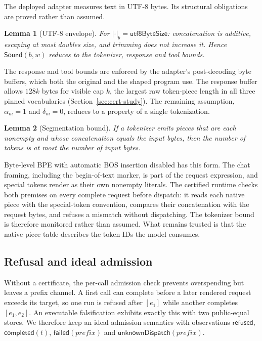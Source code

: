 \documentclass[preprint,12pt]{elsarticle}
\newtheorem{lemma}{Lemma}
\theoremstyle{definition}
\begin{document}
The deployed adapter measures text in UTF-8 bytes. Its structural obligations
are proved rather than assumed.

\begin{lemma}[UTF-8 envelope]\label{lem:utf8}
For $|\cdot|_b=\mathsf{utf8ByteSize}$: concatenation is additive, escaping at most
doubles size, and trimming does not increase it. Hence $\mathsf{Sound}(b,w)$
reduces to the tokenizer, response and tool bounds.
\end{lemma}

The response and tool bounds are enforced by the adapter's post-decoding byte
buffers, which both the original and the shaped program use. The response buffer
allows $128k$ bytes for visible cap $k$, the largest raw token-piece length in all
three pinned vocabularies (Section~\ref{sec:cert-study}). The remaining
assumption, $\alpha_m=1$ and $\delta_m=0$, reduces to a property of a single
tokenization.

\begin{lemma}[Segmentation bound]\label{lem:seg}
If a tokenizer emits pieces that are each nonempty and whose concatenation equals
the input bytes, then the number of tokens is at most the number of input bytes.
\end{lemma}

Byte-level BPE with automatic BOS insertion disabled has this form. The chat
framing, including the begin-of-text marker, is part of the request expression,
and special tokens render as their own nonempty literals. The certified runtime
checks both premises on every complete request before dispatch: it reads each
native piece with the special-token convention, compares their concatenation
with the request bytes, and refuses a mismatch without dispatching. The
tokenizer bound is therefore monitored rather than assumed. What remains trusted
is that the native piece table describes the token IDs the model consumes.

\subsection{Refusal and ideal admission}\label{sec:refusal}

Without a certificate, the per-call admission check prevents overspending but
leaves a prefix channel. A first call can complete before a later rendered
request exceeds its target, so one run is refused after $[e_1]$ while another
completes $[e_1,e_2]$. An executable falsification exhibits exactly this with two
public-equal stores. We therefore keep an ideal admission semantics with
observations $\mathsf{refused}$, $\mathsf{completed}(t)$,
$\mathsf{failed}(\textit{prefix})$ and $\mathsf{unknownDispatch}(\textit{prefix})$.
\end{document}
